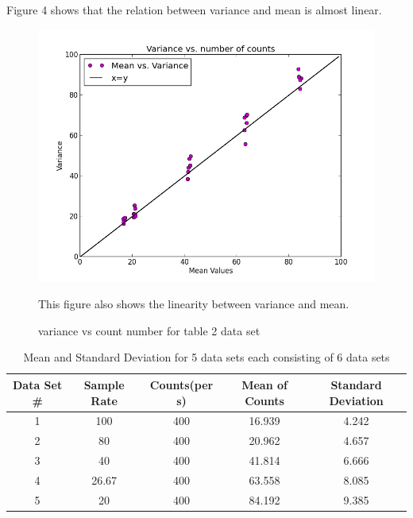 \documentclass[letterpaper,12pt]{article}
\begin{document}
Figure 4 shows that the relation between variance and mean is almost linear.

\begin{figure}
\centering
\includegraphics[scale=0.6]{variance-all-together.png}
\caption{variance vs count number for table 2 data set}
This figure also shows the linearity between variance and mean. 
\end{figure}



\begin{table}[ht]
\caption{Mean and Standard Deviation for 5 data sets each consisting of 6 data sets} %
\centering %
\begin{tabular}{c c c c c} %
\hline\hline %
Data Set \# & Sample Rate & Counts(per s) & Mean of Counts & Standard Deviation \\ [0.5ex] %
\hline %
1 & 100 & 400 & 16.939 & 4.242\\ %
2 & 80 & 400& 20.962  & 4.657 \\
3 & 40 & 400& 41.814 &  6.666 \\
4 & 26.67 & 400 & 63.558 & 8.085   \\
5 & 20 & 400 & 84.192 &  9.385 \\  [1ex] %
\hline %
\end{tabular}
\label{table:nonlin} %
\end{table}
\end{document}
